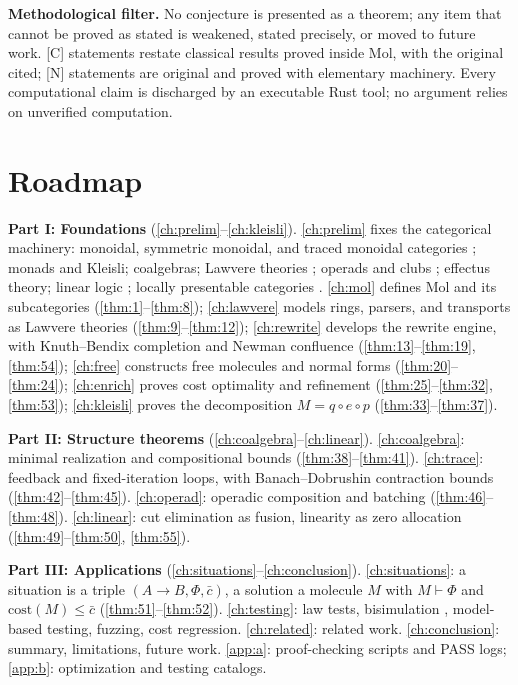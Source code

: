 \textbf{Methodological filter.} No conjecture is presented as a theorem; any item that cannot be proved as stated is weakened, stated precisely, or moved to future work. [C] statements restate classical results proved inside Mol, with the original cited; [N] statements are original and proved with elementary machinery. Every computational claim is discharged by an executable Rust tool; no argument relies on unverified computation.

\section{Roadmap}
\label{sec:roadmap}

\textbf{Part I: Foundations} (\autoref{ch:prelim}--\autoref{ch:kleisli}). \autoref{ch:prelim} fixes the categorical machinery: monoidal, symmetric monoidal, and traced monoidal categories \citep{maclane,joyalsv}; monads and Kleisli; coalgebras; Lawvere theories \citep{lawvere}; operads and clubs \citep{leinster,kelly}; effectus theory; linear logic \citep{girard}; locally presentable categories \citep{adamek}. \autoref{ch:mol} defines Mol and its subcategories (\autoref{thm:1}--\autoref{thm:8}); \autoref{ch:lawvere} models rings, parsers, and transports as Lawvere theories (\autoref{thm:9}--\autoref{thm:12}); \autoref{ch:rewrite} develops the rewrite engine, with Knuth--Bendix completion \citep{knuthbendix} and Newman confluence \citep{newman} (\autoref{thm:13}--\autoref{thm:19}, \autoref{thm:54}); \autoref{ch:free} constructs free molecules and normal forms (\autoref{thm:20}--\autoref{thm:24}); \autoref{ch:enrich} proves cost optimality and refinement (\autoref{thm:25}--\autoref{thm:32}, \autoref{thm:53}); \autoref{ch:kleisli} proves the decomposition $M = q\circ e\circ p$ (\autoref{thm:33}--\autoref{thm:37}).

\textbf{Part II: Structure theorems} (\autoref{ch:coalgebra}--\autoref{ch:linear}). \autoref{ch:coalgebra}: minimal realization and compositional bounds \citep{nerode,hopcroft} (\autoref{thm:38}--\autoref{thm:41}). \autoref{ch:trace}: feedback and fixed-iteration loops, with Banach--Dobrushin contraction bounds \citep{banach,dobroushin} (\autoref{thm:42}--\autoref{thm:45}). \autoref{ch:operad}: operadic composition and batching (\autoref{thm:46}--\autoref{thm:48}). \autoref{ch:linear}: cut elimination as fusion, linearity as zero allocation (\autoref{thm:49}--\autoref{thm:50}, \autoref{thm:55}).

\textbf{Part III: Applications} (\autoref{ch:situations}--\autoref{ch:conclusion}). \autoref{ch:situations}: a situation is a triple $(A\to B, \Phi, \bar{c})$, a solution a molecule $M$ with $M \vdash \Phi$ and $\mathrm{cost} (M) \leq \bar{c}$ (\autoref{thm:51}--\autoref{thm:52}). \autoref{ch:testing}: law tests, bisimulation \citep{park}, model-based testing, fuzzing, cost regression. \autoref{ch:related}: related work. \autoref{ch:conclusion}: summary, limitations, future work. \autoref{app:a}: proof-checking scripts and PASS logs; \autoref{app:b}: optimization and testing catalogs.
